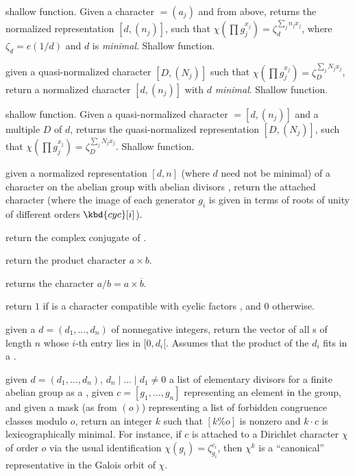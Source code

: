  shallow function. Given a
character  $ = (a_j)$ and  from 
above, returns the normalized representation $[d, (n_j)]$, such that
$\chi(\prod g_j^{x_j}) = \zeta_d^{\sum_j n_j x_j}$, where $\zeta_d =
e(1/d)$ and $d$ is \emph{minimal}. Shallow function.

 given a quasi-normalized character
$[D, (N_j)]$ such that $\chi(\prod g_j^{x_j}) = \zeta_D^{\sum_j N_j x_j}$,
return a normalized character $[d, (n_j)]$ with $d$ \emph{minimal}.
Shallow function.

 shallow function. Given a
quasi-normalized character  $ = [d, (n_j)]$ and a multiple
$D$ of $d$, returns the quasi-normalized representation $[D,
(N_j)]$, such that $\chi(\prod g_j^{x_j}) = \zeta_D^{\sum_j N_j x_j}$.
Shallow function.

 given a normalized
representation $[d, n]$ (where $d$ need not be minimal) of a character on the
abelian group with abelian divisors , return the attached character
(where the image of each generator $g_i$ is given in terms of roots
of unity of different orders $\kbd{cyc}[i]$).

 return the complex conjugate of
.

 return the product character $a\times
b$.

 returns the character
$a / b = a \times \overline{b}$.

 return $1$ if  is a character
compatible with cyclic factors , and $0$ otherwise.

 given a  $d = (d_1,\dots,d_n)$
of nonnegative integers, return the vector of all s of length
$n$ whose $i$-th entry lies in $[0,d_i[$. Assumes that the product
of the $d_i$ fits in a .

 given $d =
(d_1,\dots,d_n)$, $d_n \mid \dots \mid d_1 \neq 0$ a list of elementary
divisors for a finite abelian group as a , given $c =
[g_1,\dots,g_n]$ representing an element in the group, and given a mask
 (as from $(o)$) representing a list of
forbidden congruence classes modulo $o$, return an integer $k$ such that
$[k \% o]$ is nonzero and $k \cdot c$ is lexicographically
minimal. For instance, if $c$ is attached to a Dirichlet character $\chi$ of
order $o$ via the usual identification $\chi(g_i) = \zeta_{g_i}^{c_i}$, then
$\chi^k$ is a ``canonical'' representative in the Galois orbit of $\chi$.

